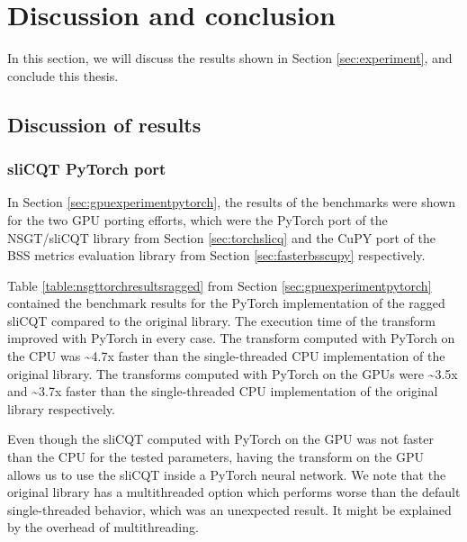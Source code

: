 \documentclass[report.tex]{subfiles}
\begin{document}
\section{Discussion and conclusion}

In this section, we will discuss the results shown in Section \ref{sec:experiment}, and conclude this thesis.

\subsection{Discussion of results}
\label{sec:discussion}

\subsubsection{sliCQT PyTorch port}
\label{sec:gpuexperimentpytorchdiscuss}

In Section \ref{sec:gpuexperimentpytorch}, the results of the benchmarks were shown for the two GPU porting efforts, which were the PyTorch port of the NSGT/sliCQT library from Section \ref{sec:torchslicq} and the CuPY port of the BSS metrics evaluation library from Section \ref{sec:fasterbsscupy} respectively.

Table \ref{table:nsgttorchresultsragged} from Section \ref{sec:gpuexperimentpytorch} contained the benchmark results for the PyTorch implementation of the ragged sliCQT compared to the original library. The execution time of the transform improved with PyTorch in every case. The transform computed with PyTorch on the CPU was \textasciitilde4.7x faster than the single-threaded CPU implementation of the original library. The transforms computed with PyTorch on the GPUs were \textasciitilde3.5x and \textasciitilde3.7x faster than the single-threaded CPU implementation of the original library respectively.

Even though the sliCQT computed with PyTorch on the GPU was not faster than the CPU for the tested parameters, having the transform on the GPU allows us to use the sliCQT inside a PyTorch neural network. We note that the original library has a multithreaded option which performs worse than the default single-threaded behavior, which was an unexpected result. It might be explained by the overhead of multithreading.
\end{document}
